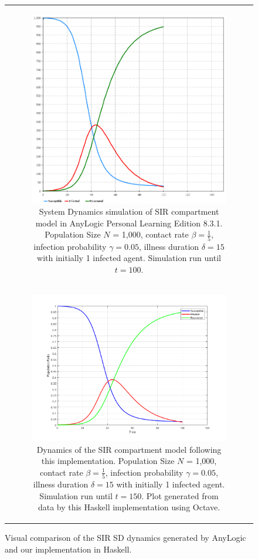 \begin{figure}
\begin{center}
	\begin{tabular}{c}
		\begin{subfigure}[b]{1.0\textwidth}
			\centering
			\includegraphics[width=.6\textwidth, angle=0]{./fig/appendix/sdsimulation/SIR_SD_1000agents_100t_ANYLOGIC.png}
			\caption{System Dynamics simulation of SIR compartment model in AnyLogic Personal Learning Edition 8.3.1. Population Size $N$ = 1,000, contact rate $\beta = \frac{1}{5}$, infection probability $\gamma = 0.05$, illness duration $\delta = 15$ with initially 1 infected agent. Simulation run until $t = 100$.}
	\label{fig:sir_sd_anylogic}
		\end{subfigure}
		
		\\
    	
		\begin{subfigure}[b]{1.0\textwidth}
			\centering
			\includegraphics[width=.7\textwidth, angle=0]{./fig/appendix/sdsimulation/SIR_SD_1000agents_100t_0001dt.png}
			\caption{Dynamics of the SIR compartment model following this implementation. Population Size $N$ = 1,000, contact rate $\beta =  \frac{1}{5}$, infection probability $\gamma = 0.05$, illness duration $\delta = 15$ with initially 1 infected agent. Simulation run until $t = 150$. Plot generated from data by this Haskell implementation using Octave.}
			\label{fig:sir_sd_dynamics}
		\end{subfigure}
	\end{tabular}
	
	\caption{Visual comparison of the SIR SD dynamics generated by AnyLogic and our implementation in Haskell.} 
	\label{fig:sir_sd_haskell_vs_anylogic}
\end{center}
\end{figure}

